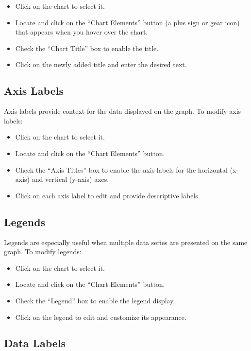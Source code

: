 \documentclass[
]{book}
\providecommand{\tightlist}{%
  \setlength{\itemsep}{0pt}\setlength{\parskip}{0pt}}
\begin{document}
\begin{itemize}
\tightlist
\item
  Click on the chart to select it.
\item
  Locate and click on the ``Chart Elements'' button (a plus sign or gear icon) that appears when you hover over the chart.
\item
  Check the ``Chart Title'' box to enable the title.
\item
  Click on the newly added title and enter the desired text.
\end{itemize}

\hypertarget{axis-labels}{%
\subsection{Axis Labels}\label{axis-labels}}

Axis labels provide context for the data displayed on the graph. To modify axis labels:

\begin{itemize}
\tightlist
\item
  Click on the chart to select it.
\item
  Locate and click on the ``Chart Elements'' button.
\item
  Check the ``Axis Titles'' box to enable the axis labels for the horizontal (x-axis) and vertical (y-axis) axes.
\item
  Click on each axis label to edit and provide descriptive labels.
\end{itemize}

\hypertarget{legends}{%
\subsection{Legends}\label{legends}}

Legends are especially useful when multiple data series are presented on the same graph. To modify legends:

\begin{itemize}
\tightlist
\item
  Click on the chart to select it.
\item
  Locate and click on the ``Chart Elements'' button.
\item
  Check the ``Legend'' box to enable the legend display.
\item
  Click on the legend to edit and customize its appearance.
\end{itemize}

\hypertarget{data-labels}{%
\subsection{Data Labels}\label{data-labels}}
\end{document}
